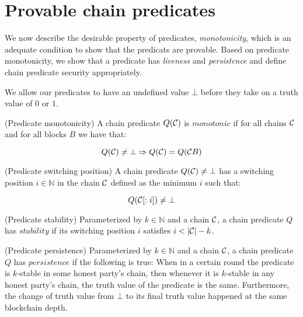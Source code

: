 \section{Provable chain predicates}

We now describe the desirable property of predicates, \textit{monotonicity},
which is an adequate condition to show that the predicats are provable. Based
on predicate monotonicity, we show that a predicate has \textit{liveness} and
\textit{persistence} and define chain predicate security appropriately.

We allow our predicates to have an undefined value $\bot$ before they take
on a truth value of $0$ or $1$.

\begin{definition}{(Predicate monotonicity)}
    A chain predicate $Q(\mathcal{C})$ is $\textit{monotonic}$ if for all chains
    $\mathcal{C}$ and for all blocks $B$ we have that:

    \begin{equation*}
        Q(\mathcal{C}) \neq \bot \Rightarrow Q(\mathcal{C}) = Q(\mathcal{C} B)
    \end{equation*}
\end{definition}

\begin{definition}{(Predicate switching position)}
    A chain predicate $Q(\mathcal{C}) \neq \bot$ has a switching position $i \in
    \mathbb{N}$ in the chain $\mathcal{C}$ defined as the minimum $i$ such that:

    \begin{equation*}
        Q(\mathcal{C}[:i]) \neq \bot
    \end{equation*}
\end{definition}

\begin{definition}{(Predicate stability)}
    Parameterized by $k \in \mathbb{N}$ and a chain $\mathcal{C}$, a chain predicate
    $Q$ has $\textit{stability}$ if its switching position $i$ satisfies $i <
    |\mathcal{C}| - k$.
\end{definition}

\begin{definition}{(Predicate persistence)}
    Parameterized by $k \in \mathbb{N}$ and a chain $\mathcal{C}$, a chain predicate
    $Q$ has $\textit{persistence}$ if the following is true: When in a certain
    round the predicate is $k$-stable in some honest party's chain, then
    whenever it is $k$-stable in any honest party's chain, the truth value of
    the predicate is the same. Furthermore, the change of truth value from
    $\bot$ to its final truth value happened at the same blockchain depth.
\end{definition}

